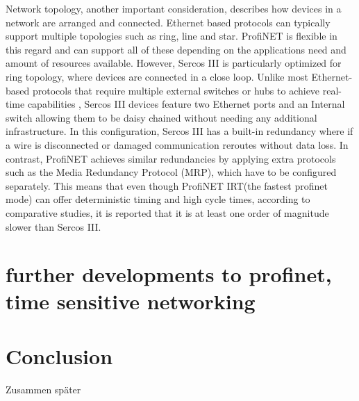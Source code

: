 \documentclass[conference]{IEEEtran}
\begin{document}
Network topology, another important consideration, describes how devices in a network are arranged and connected. Ethernet based protocols can typically support multiple topologies such as ring, line and star. ProfiNET is flexible in this regard and can support all of these depending on the applications need and amount of resources available\cite{pi2019topology}. However, Sercos III is particularly optimized for ring topology, where devices are connected in a close loop. Unlike most Ethernet-based protocols that require multiple external switches or hubs to achieve real-time capabilities , Sercos III devices feature two Ethernet ports and an Internal switch allowing them to be daisy chained without needing any additional infrastructure\cite{hibbard2010sercos}. In this configuration, Sercos III has a built-in redundancy where if a wire is disconnected or damaged communication reroutes without data loss\cite{sercosRedundancy}. In contrast, ProfiNET achieves similar redundancies by applying extra protocols such as the Media Redundancy Protocol (MRP), which have to be configured separately\cite{pi2019topology}. This means that even though ProfiNET IRT(the fastest profinet mode) can offer deterministic timing and high cycle times, according to comparative studies, it is reported that it is at least one order of magnitude slower than Sercos III\cite{kingstarEtherCAT2020}.

\section{further developments to profinet, time sensitive networking}
\section{Conclusion}

Zusammen später

\printbibliography
\end{document}
